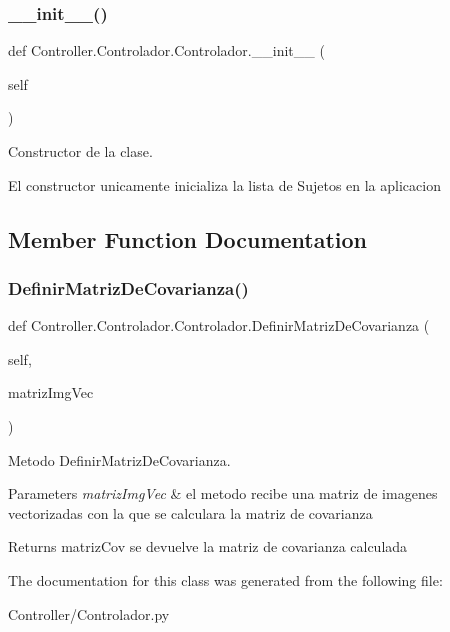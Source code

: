 \subsubsection{\texorpdfstring{\+\_\+\+\_\+init\+\_\+\+\_\+()}{\_\_init\_\_()}}
{\footnotesize\ttfamily def Controller.\+Controlador.\+Controlador.\+\_\+\+\_\+init\+\_\+\+\_\+ (\begin{DoxyParamCaption}\item[{}]{self }\end{DoxyParamCaption})}



Constructor de la clase. 

El constructor unicamente inicializa la lista de Sujetos en la aplicacion 

\subsection{Member Function Documentation}
\mbox{\label{class_controller_1_1_controlador_1_1_controlador_a4c342a4b7f56c2f8a566cdf62030816c}} 
\subsubsection{\texorpdfstring{Definir\+Matriz\+De\+Covarianza()}{DefinirMatrizDeCovarianza()}}
{\footnotesize\ttfamily def Controller.\+Controlador.\+Controlador.\+Definir\+Matriz\+De\+Covarianza (\begin{DoxyParamCaption}\item[{}]{self,  }\item[{}]{matriz\+Img\+Vec }\end{DoxyParamCaption})}



Metodo Definir\+Matriz\+De\+Covarianza. 


\begin{DoxyParams}{Parameters}
{\em matriz\+Img\+Vec} & el metodo recibe una matriz de imagenes vectorizadas con la que se calculara la matriz de covarianza \\
\hline
\end{DoxyParams}
\begin{DoxyReturn}{Returns}
matriz\+Cov se devuelve la matriz de covarianza calculada 
\end{DoxyReturn}


The documentation for this class was generated from the following file\+:\begin{DoxyCompactItemize}
\item 
Controller/Controlador.\+py\end{DoxyCompactItemize}
